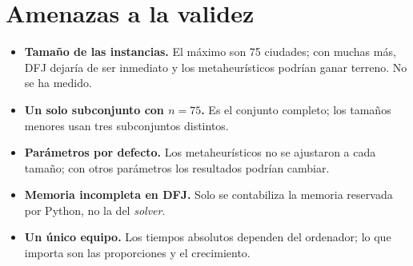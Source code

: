 \section{Amenazas a la validez}

\begin{itemize}
  \item \textbf{Tamaño de las instancias.} El máximo son 75 ciudades; con muchas más, DFJ dejaría de ser inmediato y los metaheurísticos podrían ganar terreno. No se ha medido.
  \item \textbf{Un solo subconjunto con $n=75$.} Es el conjunto completo; los tamaños menores usan tres subconjuntos distintos.
  \item \textbf{Parámetros por defecto.} Los metaheurísticos no se ajustaron a cada tamaño; con otros parámetros los resultados podrían cambiar.
  \item \textbf{Memoria incompleta en DFJ.} Solo se contabiliza la memoria reservada por Python, no la del \emph{solver}.
  \item \textbf{Un único equipo.} Los tiempos absolutos dependen del ordenador; lo que importa son las proporciones y el crecimiento.
\end{itemize}
